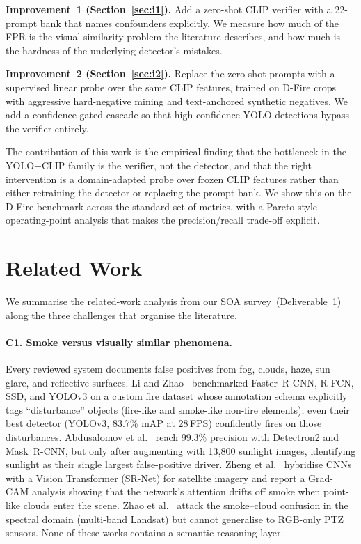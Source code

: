 \documentclass{article}
\begin{document}
\textbf{Improvement~1 (Section~\ref{sec:i1}).} Add a zero-shot CLIP verifier
with a 22-prompt bank that names confounders explicitly. We measure how much
of the FPR is the visual-similarity problem the literature describes, and how
much is the hardness of the underlying detector's mistakes.

\textbf{Improvement~2 (Section~\ref{sec:i2}).} Replace the zero-shot prompts
with a supervised linear probe over the same CLIP features, trained on D-Fire
crops with aggressive hard-negative mining and text-anchored synthetic
negatives. We add a confidence-gated cascade so that high-confidence YOLO
detections bypass the verifier entirely.

The contribution of this work is the empirical finding that the bottleneck in
the YOLO+CLIP family is the verifier, not the detector, and that the right
intervention is a domain-adapted probe over frozen CLIP features rather than
either retraining the detector or replacing the prompt bank. We show this on
the D-Fire benchmark across the standard set of metrics, with a Pareto-style
operating-point analysis that makes the precision/recall trade-off explicit.

\section{Related Work}
\label{sec:related}

We summarise the related-work analysis from our SOA survey~(Deliverable~1)
along the three challenges that organise the literature.

\paragraph{C1. Smoke versus visually similar phenomena.}
Every reviewed system documents false positives from fog, clouds, haze, sun
glare, and reflective surfaces. Li and Zhao~\cite{cnn_fire_detection}
benchmarked Faster~R-CNN, R-FCN, SSD, and YOLOv3 on a custom fire dataset whose
annotation schema explicitly tags ``disturbance'' objects (fire-like and
smoke-like non-fire elements); even their best detector (YOLOv3, 83.7\% mAP
at 28\,FPS) confidently fires on those disturbances. Abdusalomov
et al.~\cite{detectron2fire} reach 99.3\% precision with Detectron2 and
Mask~R-CNN, but only after augmenting with 13{,}800 sunlight images, identifying
sunlight as their single largest false-positive driver. Zheng
et al.~\cite{cnn_vit_smoke} hybridise CNNs with a Vision Transformer
(SR-Net) for satellite imagery and report a Grad-CAM analysis showing that the
network's attention drifts off smoke when point-like clouds enter the scene.
Zhao et al.~\cite{spectral_smoke} attack the smoke--cloud confusion in the
spectral domain (multi-band Landsat) but cannot generalise to RGB-only PTZ
sensors. None of these works contains a semantic-reasoning layer.
\end{document}
